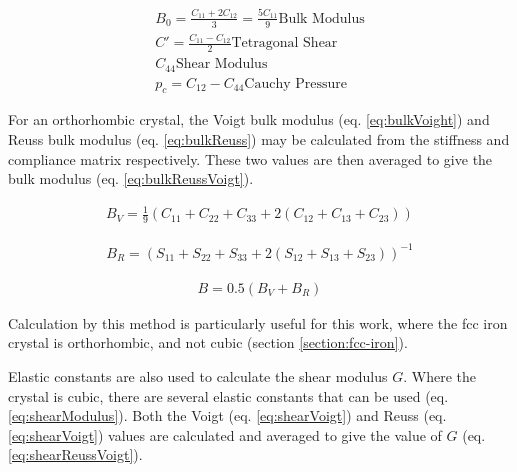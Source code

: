 \begin{equation}
\begin{split}
B_{0} = \frac{C_{11} + 2 C_{12}}{3} = \frac{5 C_{11}}{9} \text{Bulk Modulus} \\
C' = \frac{C_{11} - C_{12}}{2} \text{Tetragonal Shear} \\
C_{44} \text{Shear Modulus} \\
p_{c} = C_{12} - C_{44}  \text{Cauchy Pressure} 
\end{split}
\label{eq:cubicProperties}
\end{equation}


For an orthorhombic crystal, the Voigt bulk modulus (eq. \ref{eq:bulkVoight}) and Reuss bulk modulus (eq. \ref{eq:bulkReuss}) may be calculated from the stiffness and compliance matrix respectively.  These two values are then averaged to give the bulk modulus (eq. \ref{eq:bulkReussVoigt})\cite{DftTiSiRavindran}.

\begin{equation}
\begin{split}
B_{V} = \frac{1}{9} \left( C_{11} + C_{22} + C_{33} + 2(C_{12} + C_{13} + C_{23}) \right)
\end{split}
\label{eq:bulkVoight}
\end{equation}

\begin{equation}
\begin{split}
B_{R} = \left( S_{11} + S_{22} + S_{33} + 2(S_{12} + S_{13} + S_{23}) \right)^{-1}
\end{split}
\label{eq:bulkReuss}
\end{equation}

\begin{equation}
\begin{split}
B = 0.5(B_V + B_R)
\end{split}
\label{eq:bulkReussVoigt}
\end{equation}

Calculation by this method is particularly useful for this work, where the \acrshort{fcc} iron crystal is orthorhombic, and not cubic (section \ref{section:fcc-iron}).

Elastic constants are also used to calculate the shear modulus $G$.  Where the crystal is cubic, there are several elastic constants that can be used (eq. \ref{eq:shearModulus})\cite{DftTiSiRavindran}.  Both the Voigt (eq. \ref{eq:shearVoigt}) and Reuss (eq. \ref{eq:shearVoigt}) values are calculated and averaged to give the value of $G$ (eq. \ref{eq:shearReussVoigt}).  

